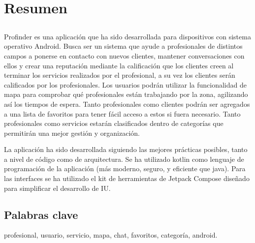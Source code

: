 \chapter*{Resumen}

\section*{\tituloPortadaVal}

Profinder es una aplicación que ha sido desarrollada para dispositivos con sistema operativo Android. Busca ser un sistema que ayude a profesionales de distintos campos a ponerse en contacto con nuevos clientes, mantener conversaciones con ellos y crear una reputación mediante la calificación que los clientes creen al terminar los servicios realizados por el profesional, a su vez los clientes serán calificados por los profesionales. Los usuarios podrán utilizar la funcionalidad de mapa para comprobar qué profesionales están trabajando por la zona, agilizando así los tiempos de espera. Tanto profesionales como clientes podrán ser agregados a una lista de favoritos para tener fácil acceso a estos si fuera necesario. Tanto profesionales como servicios estarán clasificados dentro de categorías que permitirán una mejor gestión y organización.

La aplicación ha sido desarrollada siguiendo las mejores prácticas posibles, tanto a nivel de código como de arquitectura. Se ha utilizado kotlin como lenguaje de programación de la aplicación (más moderno, seguro, y eficiente que java). Para las interfaces se ha utilizado el kit de herramientas de Jetpack Compose diseñado para simplificar el desarrollo de IU.

\section*{Palabras clave}
   
\noindent profesional, usuario, servicio, mapa, chat, favoritos, categoría, android.

   


